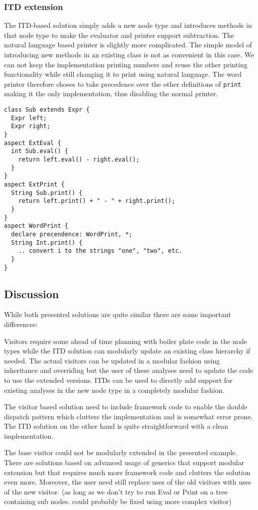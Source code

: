 \subsubsection{ITD extension}
The ITD-based solution simply adds a new node type and introduces methods in that
node type to make the evaluator and printer support subtraction.
The natural language based printer is slightly more complicated. The simple
model of introducing new methods in an existing class is not as convenient
in this case. We can not keep the implementation printing numbers and reuse
the other printing functionality while still changing it to print using
natural language. The word printer therefore choses to take precedence over
the other definitions of \texttt{print} making it the only implementation, thus
disabling the normal printer.

\begin{lstlisting}[caption={ITD Extension}]
class Sub extends Expr {
  Expr left;
  Expr right;
}
aspect ExtEval {
  int Sub.eval() {
    return left.eval() - right.eval();
  }
}
aspect ExtPrint {
  String Sub.print() {
    return left.print() + " - " + right.print(); 
  }
}
aspect WordPrint {
  declare precendence: WordPrint, *;
  String Int.print() {
    .. convert i to the strings "one", "two", etc.
  }
}
\end{lstlisting}

\subsection{Discussion}
While both presented solutions are quite similar there are some important
differences:

Visitors require some ahead of time planning with boiler plate code in the 
node types while the ITD solution can modularly update an existing class 
hierarchy if needed. The actual visitors can be updated in a 
modular fashion using inheritance and overriding but the user of these 
analyses need to update the code to use the extended versions. ITDs can 
be used to directly add support for existing analyses in the new node type 
in a completely modular fashion. 

The visitor based solution need to include framework code to enable the 
double dispatch pattern which clutters the implementation and is somewhat 
error prone. The ITD solution on the other hand is quite 
straightforward with a clean implementation.

The base visitor could not be modularly extended in the presented example.
There are solutions based on advanced usage of generics that support
modular extension but that requires much more framework code and clutters
the solution even more. Moreover, the user need still replace uses of the
old visitors with uses of the new visitor.
(as long as we don't try to run Eval
or Print on a tree containing sub nodes. could probably be fixed using more
complex visitor)

